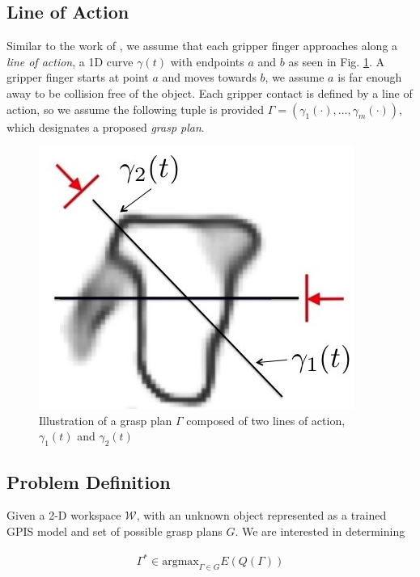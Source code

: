 \documentclass[letterpaper, 10 pt, conference]{ieeeconf}  %
\begin{document}
\subsection{Line of Action}
Similar to the work of \cite{christopoulos2007handling}, we assume that each gripper finger approaches along a \textit{line of action}, a 1D curve $\gamma(t)$ with endpoints $a$ and $b$ as seen in Fig. \ref{fig:line_of_action}. A gripper finger starts at point $a$ and moves towards $b$, we assume $a$ is far enough away to be collision free of the object.  Each gripper contact is defined by a line of action, so we assume the following tuple is provided $\Gamma = ( \gamma_1(\cdot),...,\gamma_m(\cdot) )$, which designates a proposed \textit{grasp plan}. 

\begin{figure}[ht!]
\centering
\includegraphics[scale = 0.3]{figures/Slide01.jpg}
\caption{Illustration of a grasp plan $\Gamma$ composed of two lines of action, $\gamma_1(t)$ and $\gamma_2(t)$}
\vspace*{-10pt}
\label{fig:line_of_action}
\end{figure}

\subsection{Problem Definition}

Given a 2-D workspace $\mathcal{W}$, with an unknown object represented as a trained GPIS model and set of possible grasp plans $G$. We are interested in determining 

\begin{align}\label{eq:problem_def}
\Gamma^* \in \mbox{argmax}_{\Gamma \in G} E(Q(\Gamma))
\end{align}
\end{document}
